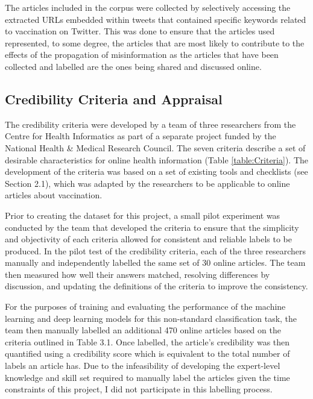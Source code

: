 \documentclass[a4paper,twoside,phd]{BYUPhys}
\begin{document}
The articles included in the corpus were collected by selectively accessing the extracted URLs embedded within tweets that contained specific keywords related to vaccination on Twitter. This was done to ensure that the articles used represented, to some degree, the articles that are most likely to contribute to the effects of the propagation of misinformation as the articles that have been collected and labelled are the ones being shared and discussed online. \newline




\subsection{Credibility Criteria and Appraisal}
\label{sec:CredibilityCriteria}
The credibility criteria were developed by a team of three researchers from the Centre for Health Informatics as part of a separate project funded by the National Health \& Medical Research Council. The seven criteria describe a set of desirable characteristics for online health information (Table \ref{table:Criteria}). The development of the criteria was based on a set of existing tools and checklists (see Section 2.1), which was adapted by the researchers to be applicable to online articles about vaccination. \newline

Prior to creating the dataset for this project, a small pilot experiment was conducted by the team that developed the criteria to ensure that the simplicity and objectivity of each criteria allowed for consistent and reliable labels to be produced. In the pilot test of the credibility criteria, each of the three researchers manually and independently labelled the same set of 30 online articles. The team then measured how well their answers matched, resolving differences by discussion, and updating the definitions of the criteria to improve the consistency. \newline

For the purposes of training and evaluating the performance of the machine learning and deep learning models for this non-standard classification task, the team then manually labelled an additional 470 online articles based on the criteria outlined in Table 3.1. Once labelled, the article's credibility was then quantified using a credibility score which is equivalent to the total number of labels an article has. Due to the infeasibility of developing the expert-level knowledge and skill set required to manually label the articles given the time constraints of this project, I did not participate in this labelling process.\newline
\end{document}
